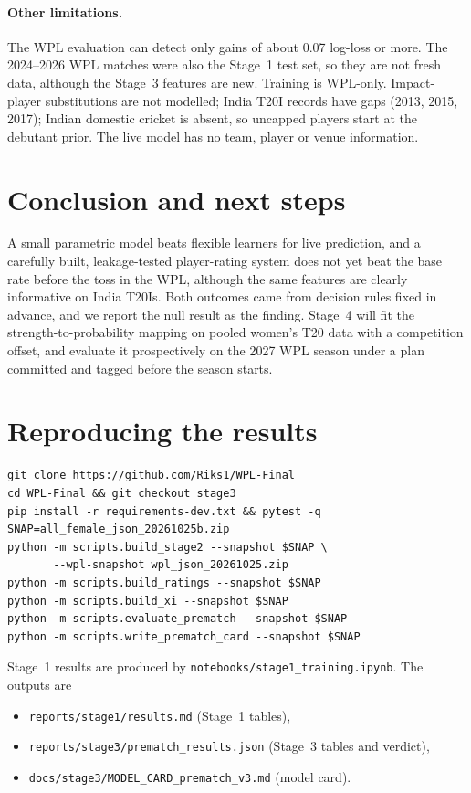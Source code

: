 \documentclass[11pt]{article}
\newcommand{\code}[1]{\texttt{#1}}
\begin{document}
\paragraph{Other limitations.} The WPL evaluation can detect only gains of about 0.07 log-loss or more.
The 2024--2026 WPL matches were also the Stage~1 test set, so they are not fresh data, although the Stage~3
features are new. Training is WPL-only. Impact-player substitutions are not modelled; India T20I records
have gaps (2013, 2015, 2017); Indian domestic cricket is absent, so uncapped players start at the debutant
prior. The live model has no team, player or venue information.

\section{Conclusion and next steps}

A small parametric model beats flexible learners for live prediction, and a carefully built, leakage-tested
player-rating system does not yet beat the base rate before the toss in the WPL, although the same features
are clearly informative on India T20Is. Both outcomes came from decision rules fixed in advance, and we
report the null result as the finding. Stage~4 will fit the strength-to-probability mapping on pooled
women's T20 data with a competition offset, and evaluate it prospectively on the 2027 WPL season under a
plan committed and tagged before the season starts.




\appendix
\section{Reproducing the results}\label{app:repro}
\begin{verbatim}
git clone https://github.com/Riks1/WPL-Final
cd WPL-Final && git checkout stage3
pip install -r requirements-dev.txt && pytest -q
SNAP=all_female_json_20261025b.zip
python -m scripts.build_stage2 --snapshot $SNAP \
       --wpl-snapshot wpl_json_20261025.zip
python -m scripts.build_ratings --snapshot $SNAP
python -m scripts.build_xi --snapshot $SNAP
python -m scripts.evaluate_prematch --snapshot $SNAP
python -m scripts.write_prematch_card --snapshot $SNAP
\end{verbatim}
Stage~1 results are produced by \code{notebooks/stage1\_training.ipynb}. The outputs are
\begin{itemize}
  \item \code{reports/stage1/results.md} (Stage~1 tables),
  \item \code{reports/stage3/prematch\_results.json} (Stage~3 tables and verdict),
  \item \code{docs/stage3/MODEL\_CARD\_prematch\_v3.md} (model card).
\end{itemize}
\end{document}
